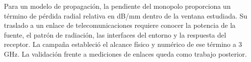 Para un modelo de propagación, la pendiente del monopolo proporciona un término de pérdida radial relativa en dB/mm dentro de la ventana estudiada. Su traslado a un enlace de telecomunicaciones requiere conocer la potencia de la fuente, el patrón de radiación, las interfaces del entorno y la respuesta del receptor. La campaña estableció el alcance físico y numérico de ese término a 3 GHz. La validación frente a mediciones de enlaces queda como trabajo posterior.
